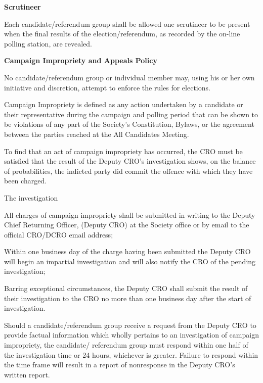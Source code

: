 \begin{longenum}[label*=\arabic*., align=left]
 \item \textbf{Scrutineer}
 \begin{longenum}[label*=\arabic*., align=left]
\item Each candidate/referendum group shall be allowed one scrutineer to be present when the final results of the election/referendum, as recorded by the on-line polling station, are revealed.
 \end{longenum}
 \item 	\textbf{Campaign Impropriety and Appeals Policy}	
 \begin{longenum}[label*=\arabic*., align=left]
\item No candidate/referendum group or individual member may, using his or her own initiative and 
discretion, attempt to enforce the rules for elections.
\item Campaign Impropriety is defined as any action undertaken by a candidate or their representative 
during the campaign and polling period that can be shown to be violations of any part of the Society's 
Constitution, Bylaws, or the agreement between the parties reached at the All Candidates Meeting.
\item To find that an act of campaign impropriety has occurred, the CRO must be satisfied that the result of 
the Deputy CRO's investigation shows, on the balance of probabilities, the indicted party did commit the 
offence with which they have been charged.
\item The investigation
\begin{longenum}[label*=\arabic*., align=left]
\item All charges of campaign impropriety shall be submitted in writing to the Deputy Chief Returning Officer, (Deputy CRO) at the Society office or by email to the official CRO/DCRO email address;
\item Within one business day of the charge having been submitted the Deputy CRO will begin an impartial investigation and will also notify the CRO of the pending investigation; 
\item Barring exceptional circumstances, the Deputy CRO shall submit the result of their investigation to the CRO no more than one business day after the start of investigation.
\end{longenum}
\item Should a candidate/referendum group receive a request from the Deputy CRO to provide factual information which wholly pertains to an investigation of campaign impropriety, the candidate/ referendum group must respond within one half of the investigation time or 24 hours, whichever is greater. Failure to respond within the time frame will result in a report of nonresponse in the Deputy CRO's written report.

\end{longenum}
\end{longenum}

